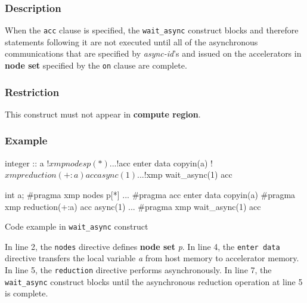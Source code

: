 \subsubsection*{Description}
When the {\tt acc} clause is specified,
the {\tt wait\_async} construct blocks and therefore
statements following it are not executed until all of the asynchronous
communications that are specified by {\it async-id}'s and issued on the accelerators in
{\bf node set} specified by the {\tt on} clause are complete.

\subsubsection*{Restriction}
This construct must not appear in {\OACC} {\bf compute region}.

\subsubsection*{Example}
\begin{myfigure}
\begin{minipage}{0.45\hsize}
\begin{center}
\begin{XACCFexampleL}
integer :: a
!$xmp nodes p(*)
...
!$acc enter data copyin(a)
!$xmp reduction(+:a) acc async(1)
...
!$xmp wait_async(1) acc
\end{XACCFexampleL}
\end{center}
\end{minipage}
%
\begin{minipage}{0.53\hsize}
\begin{center}
\begin{XACCCexampleR}
int a;
#pragma xmp nodes p[*]
...
#pragma acc enter data copyin(a)
#pragma xmp reduction(+:a) acc async(1)
...
#pragma xmp wait_async(1) acc
\end{XACCCexampleR}
\end{center}
\end{minipage}
\caption{Code example in {\tt wait\_async} construct}\label{code:waitasync}
\end{myfigure}

In line 2,
the {\tt nodes} directive defines {\bf node set} {\it p}.
In line 4,
the {\tt enter data} directive transfers the local variable {\it a} from host memory to accelerator memory.
In line 5,
the {\tt reduction} directive performs asynchronously.
In line 7,
the {\tt wait\_async} construct blocks until the asynchronous reduction operation at line 5 is complete.

